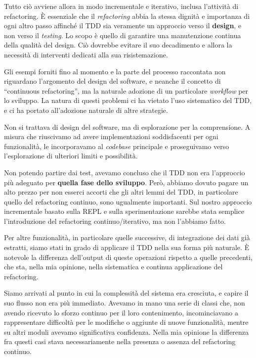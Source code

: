 \documentclass[12pt]{report}
\begin{document}
Tutto ciò avviene allora in modo incrementale e iterativo, inclusa 
l'attività di refactoring. È essenziale che il \textit{refactoring} 
abbia la stessa dignità e importanza di ogni altro passo affinché il 
TDD sia veramente un approccio verso il \textbf{design}, e non verso 
il \textit{testing}. Lo scopo è quello di garantire una manutenzione 
continua della qualità del design. Ciò dovrebbe evitare il suo decadimento
e allora la necessità di interventi dedicati alla sua risistemazione.

Gli esempi forniti fino al momento e la parte del processo raccontata
non riguardano l'argomento del design del software, e neanche il concetto
di ``continuous refactoring'', ma la naturale adozione di un particolare 
\textit{workflow} per lo sviluppo. La natura di questi problemi ci ha 
vietato l'uso sistematico del TDD, e ci ha portato all'adozione naturale 
di altre strategie. 

Non si trattava di design del software, ma di esplorazione per la 
comprensione. A misura che riuscivamo ad avere implementazioni 
soddisfacenti per ogni funzionalità, le incorporavamo al \textit{codebase}
principale e proseguivamo verso l'esplorazione di ulteriori limiti 
e possibilità.

Non potendo partire dai test, avevamo concluso che il TDD non era
l'approccio più adeguato per \textbf{quella fase dello sviluppo}. 
Però, abbiamo dovuto pagare un alto prezzo per non esserci accorti 
che gli altri lemmi del TDD, in particolare quello del refactoring 
continuo, sono ugualmente importanti. Sul nostro approccio incrementale 
basato sulla REPL e sulla sperimentazione sarebbe stata semplice 
l'introduzione del refactoring continuo/iterativo,
ma non l'abbiamo fatto.

Per altre funzionalità, in particolare quelle successive, di integrazione 
dei dati già estratti, siamo stati in grado di applicare il TDD nella 
sua forma più naturale. È notevole la differenza dell'output di 
queste operazioni rispetto a quelle precedenti, che sta, nella 
mia opinione, nella sistematica e continua applicazione del refactoring.

Siamo arrivati al punto in cui la complessità del sistema era 
cresciuta, e capire il suo flusso non era più immediato. Avevamo 
in mano una serie di classi che, non avendo ricevuto lo sforzo 
continuo per il loro contenimento, incominciavano a rappresentare 
difficoltà per le modifiche o aggiunte di nuove funzionalità, 
mentre su altri moduli avevamo significativa confidenza. Nella 
mia opinione la differenza fra questi casi stava necessariamente 
nella presenza o assenza del refactoring continuo.
\end{document}
